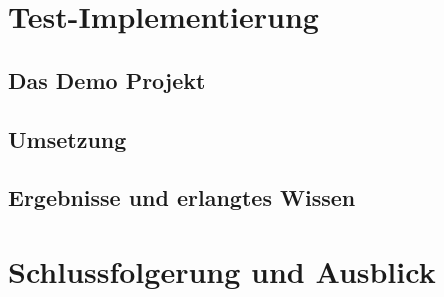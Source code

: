 \documentclass[biblatex]{lni}
\begin{document}
\section{Test-Implementierung}
\subsection{Das Demo Projekt}
\subsection{Umsetzung}
\subsection{Ergebnisse und erlangtes Wissen}

\section{Schlussfolgerung und Ausblick}

\newpage
\printbibliography
\end{document}
